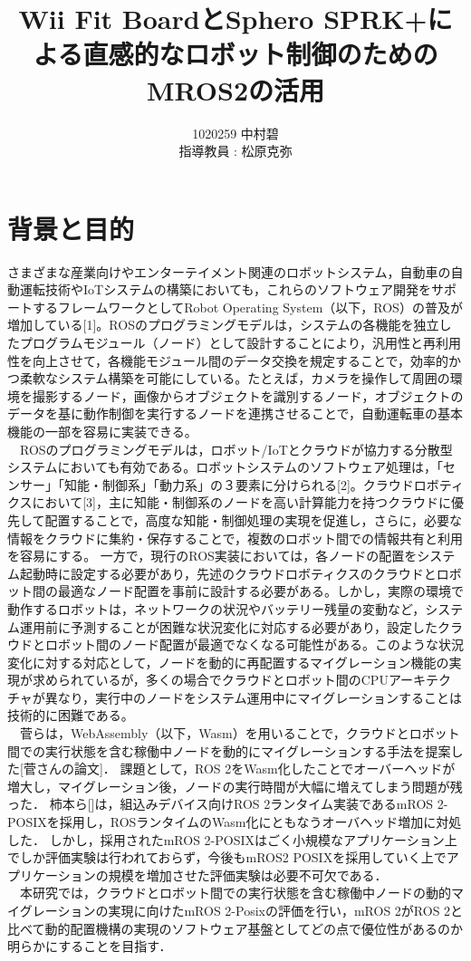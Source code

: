 \documentclass[11pt]{ujarticle}
\author{%
1020259 中村碧\\指導教員 : 松原克弥
}
\title{Wii Fit BoardとSphero SPRK+による直感的なロボット制御のためのMROS2の活用}
\begin{document}
\maketitle

\section{背景と目的}
さまざまな産業向けやエンターテイメント関連のロボットシステム，自動車の自動運転技術やIoTシステムの構築においても，これらのソフトウェア開発をサポートするフレームワークとしてRobot Operating System（以下，ROS）の普及が増加している[1]。ROSのプログラミングモデルは，システムの各機能を独立したプログラムモジュール（ノード）として設計することにより，汎用性と再利用性を向上させて，各機能モジュール間のデータ交換を規定することで，効率的かつ柔軟なシステム構築を可能にしている。たとえば，カメラを操作して周囲の環境を撮影するノード，画像からオブジェクトを識別するノード，オブジェクトのデータを基に動作制御を実行するノードを連携させることで，自動運転車の基本機能の一部を容易に実装できる。
\\　ROSのプログラミングモデルは，ロボット/IoTとクラウドが協力する分散型システムにおいても有効である。ロボットシステムのソフトウェア処理は，「センサー」「知能・制御系」「動力系」の３要素に分けられる[2]。クラウドロボティクスにおいて[3]，主に知能・制御系のノードを高い計算能力を持つクラウドに優先して配置することで，高度な知能・制御処理の実現を促進し，さらに，必要な情報をクラウドに集約・保存することで，複数のロボット間での情報共有と利用を容易にする。
一方で，現行のROS実装においては，各ノードの配置をシステム起動時に設定する必要があり，先述のクラウドロボティクスのクラウドとロボット間の最適なノード配置を事前に設計する必要がある。しかし，実際の環境で動作するロボットは，ネットワークの状況やバッテリー残量の変動など，システム運用前に予測することが困難な状況変化に対応する必要があり，設定したクラウドとロボット間のノード配置が最適でなくなる可能性がある。このような状況変化に対する対応として，ノードを動的に再配置するマイグレーション機能の実現が求められているが，多くの場合でクラウドとロボット間のCPUアーキテクチャが異なり，実行中のノードをシステム運用中にマイグレーションすることは技術的に困難である。
\\　菅らは，WebAssembly（以下，Wasm）を用いることで，クラウドとロボット間での実行状態を含む稼働中ノードを動的にマイグレーションする手法を提案した[菅さんの論文]．
課題として，ROS 2をWasm化したことでオーバーヘッドが増大し，マイグレーション後，ノードの実行時間が大幅に増えてしまう問題が残った．
柿本ら[]は，組込みデバイス向けROS 2ランタイム実装であるmROS 2-POSIXを採用し，ROSランタイムのWasm化にともなうオーバヘッド増加に対処した．
しかし，採用されたmROS 2-POSIXはごく小規模なアプリケーション上でしか評価実験は行われておらず，今後もmROS2 POSIXを採用していく上でアプリケーションの規模を増加させた評価実験は必要不可欠である．
\\　本研究では，クラウドとロボット間での実行状態を含む稼働中ノードの動的マイグレーションの実現に向けたmROS 2-Posixの評価を行い，mROS 2がROS 2と比べて動的配置機構の実現のソフトウェア基盤としてどの点で優位性があるのか明らかにすることを目指す．
\end{document}
